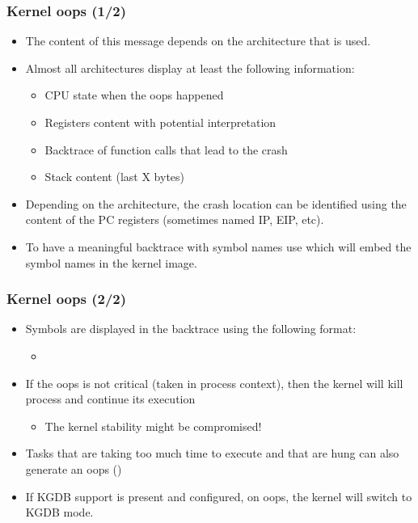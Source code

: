 \begin{frame}
  \frametitle{Kernel oops (1/2)}
  \begin{itemize}
    \item The content of this message depends on the architecture that is used.
    \item Almost all architectures display at least the following information:
    \begin{itemize}
      \item CPU state when the oops happened
      \item Registers content with potential interpretation
      \item Backtrace of function calls that lead to the crash
      \item Stack content (last X bytes)
    \end{itemize}
    \item Depending on the architecture, the crash location can be identified
          using the content of the PC registers (sometimes named IP, EIP, etc).
    \item To have a meaningful backtrace with symbol names use
           which will embed the
          symbol names in the kernel image.
  \end{itemize}
\end{frame}

\begin{frame}
  \frametitle{Kernel oops (2/2)}
  \begin{itemize}
    \item Symbols are displayed in the backtrace using the following format:
    \begin{itemize}
      \item {}
    \end{itemize}
    \item If the oops is not critical (taken in process context), then the
          kernel will kill process and continue its execution
    \begin{itemize}
      \item The kernel stability might be compromised!
    \end{itemize}
    \item Tasks that are taking too much time to execute and that are hung can
          also generate an oops ()
    \item If KGDB support is present and configured, on oops, the kernel will
          switch to KGDB mode.
  \end{itemize}
\end{frame}

